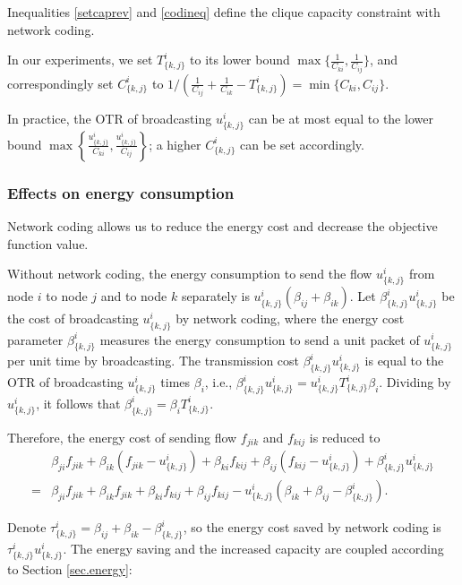 Inequalities \eqref{setcaprev} and \eqref{codineq} define the clique capacity constraint with network coding.

 In our experiments, we set \(T^i_{\{k,j\}}\) to its lower bound \(\max \{\frac{1}{C_{ki}}, \frac{1}{C_{ij}}\}\), 
 and correspondingly set $C^i_{\{k,j\}}$ to $1 / ( \frac{1}{C_{ij}}  +\frac{1}{C_{ik}} - T^i_{\{k,j\}}) = \min \{C_{ki}, C_{ij}\}$.
 
 In practice, the OTR of broadcasting \(u^i_{\{k,j\}}\) can be at most equal to the lower bound \(\max  \left \{\frac{u^i_{\{k,j\}}}{C_{ki}}, \frac{u^i_{\{k,j\}}}{C_{ij}} \right \}\); a higher \(C^i_{\{k,j\}}\) can be set accordingly.

 \subsubsection{Effects on energy consumption}
Network coding allows us to reduce the energy cost and decrease the objective function value.

Without network coding, the energy consumption to send the flow \(u^i_{\{k,j\}}\) from node \(i\) to node \(j\) and to node \(k\) separately is \(u^i_{\{k,j\}}(\beta_{ij} + \beta_{ik})\). Let \({\beta}^i_{\{k,j\}} u^i_{\{k,j\}}\) be the cost of broadcasting \(u^i_{\{k,j\}}\) by network coding, where the energy cost parameter \({\beta}^i_{\{k,j\}}\) measures the energy consumption to send a unit packet of  \(u^i_{\{k,j\}}\) per unit time by broadcasting. 
The transmission cost \({\beta}^i_{\{k,j\}} u^i_{\{k,j\}}\) is equal to the OTR of broadcasting \(u^i_{\{k,j\}}\) times \(\beta_i\), i.e., \({\beta}^i_{\{k,j\}} u^i_{\{k,j\}}=u^i_{\{k,j\}}T^i_{\{k,j\}} \beta_i\). Dividing by \(u^i_{\{k,j\}}\), it follows that   \({\beta}^i_{\{k,j\}} = \beta_i T^i_{\{k,j\}}\).

Therefore, the energy cost of sending flow \(f_{jik}\) and \(f_{kij}\) is reduced to
\begin{equation}
\begin{split}
    &\beta_{ji}f_{jik}+ \beta_{ik}(f_{jik}- u^i_{\{k,j\}}) +  \beta_{ki} f_{kij}+ \beta_{ij}(f_{kij} - u^i_{\{k,j\}}) +\beta^i_{\{k,j\}} u^i_{\{k,j\}} \\
    =& \beta_{ji}f_{jik}+ \beta_{ik}f_{jik} +  \beta_{ki} f_{kij}+ \beta_{ij}f_{kij}  - u^i_{\{k,j\}} (\beta_{ik} +\beta_{ij} - \beta^i_{\{k,j\}}  ).
\end{split}
\end{equation}


Denote \(\tau^i_{\{k,j\}} = \beta_{ij} + \beta_{ik} - {\beta}^i_{\{k,j\}}\), so the energy cost saved by network coding is \(\tau^i_{\{k,j\}}u^i_{\{k,j\}}\). The energy saving and the increased capacity are coupled according to Section \ref{sec.energy}:

